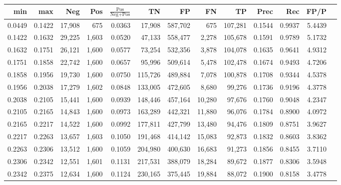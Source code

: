 \begin{tabular}{rrrrrrrrrrrrr}
\toprule
   min &    max &    Neg &   Pos & $\frac{\text{Pos}}{\text{Neg}+\text{Pos}}$ &      TN &      FP &      FN &      TP &   Prec &    Rec &   FP/P \\
\midrule
0.0449 & 0.1422 & 17,908 &   675 &                                     0.0363 &  17,908 & 587,702 &     675 & 107,281 & 0.1544 & 0.9937 & 5.4439 \\
0.1422 & 0.1632 & 29,225 & 1,603 &                                     0.0520 &  47,133 & 558,477 &   2,278 & 105,678 & 0.1591 & 0.9789 & 5.1732 \\
0.1632 & 0.1751 & 26,121 & 1,600 &                                     0.0577 &  73,254 & 532,356 &   3,878 & 104,078 & 0.1635 & 0.9641 & 4.9312 \\
0.1751 & 0.1858 & 22,742 & 1,600 &                                     0.0657 &  95,996 & 509,614 &   5,478 & 102,478 & 0.1674 & 0.9493 & 4.7206 \\
0.1858 & 0.1956 & 19,730 & 1,600 &                                     0.0750 & 115,726 & 489,884 &   7,078 & 100,878 & 0.1708 & 0.9344 & 4.5378 \\
0.1956 & 0.2038 & 17,279 & 1,602 &                                     0.0848 & 133,005 & 472,605 &   8,680 &  99,276 & 0.1736 & 0.9196 & 4.3778 \\
0.2038 & 0.2105 & 15,441 & 1,600 &                                     0.0939 & 148,446 & 457,164 &  10,280 &  97,676 & 0.1760 & 0.9048 & 4.2347 \\
0.2105 & 0.2165 & 14,843 & 1,600 &                                     0.0973 & 163,289 & 442,321 &  11,880 &  96,076 & 0.1784 & 0.8900 & 4.0972 \\
0.2165 & 0.2217 & 14,522 & 1,600 &                                     0.0992 & 177,811 & 427,799 &  13,480 &  94,476 & 0.1809 & 0.8751 & 3.9627 \\
0.2217 & 0.2263 & 13,657 & 1,603 &                                     0.1050 & 191,468 & 414,142 &  15,083 &  92,873 & 0.1832 & 0.8603 & 3.8362 \\
0.2263 & 0.2306 & 13,512 & 1,600 &                                     0.1059 & 204,980 & 400,630 &  16,683 &  91,273 & 0.1856 & 0.8455 & 3.7110 \\
0.2306 & 0.2342 & 12,551 & 1,601 &                                     0.1131 & 217,531 & 388,079 &  18,284 &  89,672 & 0.1877 & 0.8306 & 3.5948 \\
0.2342 & 0.2375 & 12,634 & 1,600 &                                     0.1124 & 230,165 & 375,445 &  19,884 &  88,072 & 0.1900 & 0.8158 & 3.4778 \\

\end{tabular}
